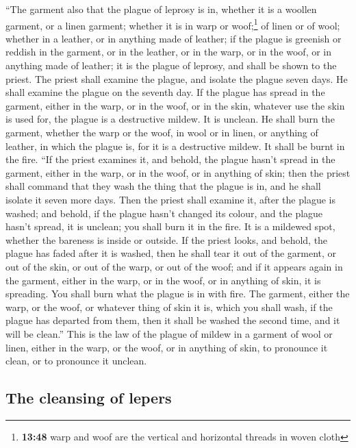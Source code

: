  ``The garment also that the plague of leprosy is in,
whether it is a woollen garment, or a linen garment; 
whether it is in warp or woof;\footnote{\textbf{13:48} warp and woof are
  the vertical and horizontal threads in woven cloth} of linen or of
wool; whether in a leather, or in anything made of leather;
 if the plague is greenish or reddish in the garment, or
in the leather, or in the warp, or in the woof, or in anything made of
leather; it is the plague of leprosy, and shall be shown to the priest.
 The priest shall examine the plague, and isolate the
plague seven days.  He shall examine the plague on the
seventh day. If the plague has spread in the garment, either in the
warp, or in the woof, or in the skin, whatever use the skin is used for,
the plague is a destructive mildew. It is unclean.  He
shall burn the garment, whether the warp or the woof, in wool or in
linen, or anything of leather, in which the plague is, for it is a
destructive mildew. It shall be burnt in the fire.  ``If
the priest examines it, and behold, the plague hasn't spread in the
garment, either in the warp, or in the woof, or in anything of skin;
 then the priest shall command that they wash the thing
that the plague is in, and he shall isolate it seven more days.
 Then the priest shall examine it, after the plague is
washed; and behold, if the plague hasn't changed its colour, and the
plague hasn't spread, it is unclean; you shall burn it in the fire. It
is a mildewed spot, whether the bareness is inside or outside.
 If the priest looks, and behold, the plague has faded
after it is washed, then he shall tear it out of the garment, or out of
the skin, or out of the warp, or out of the woof;  and if
it appears again in the garment, either in the warp, or in the woof, or
in anything of skin, it is spreading. You shall burn what the plague is
in with fire.  The garment, either the warp, or the woof,
or whatever thing of skin it is, which you shall wash, if the plague has
departed from them, then it shall be washed the second time, and it will
be clean.''  This is the law of the plague of mildew in a
garment of wool or linen, either in the warp, or the woof, or in
anything of skin, to pronounce it clean, or to pronounce it unclean.

\hypertarget{the-cleansing-of-lepers}{%
\subsection{The cleansing of lepers}\label{the-cleansing-of-lepers}}

